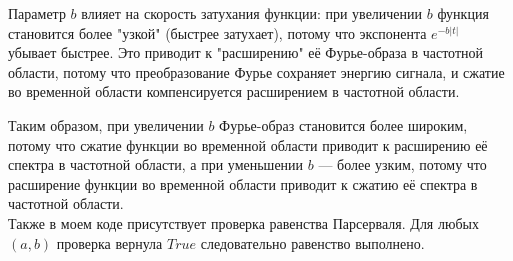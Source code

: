 \documentclass[a4paper,12pt]{article}
\begin{document}
Параметр \( b \) влияет на скорость затухания функции: при увеличении \( b \) функция становится более "узкой" (быстрее затухает), потому что экспонента \( e^{-b |t|} \) убывает быстрее. Это приводит к "расширению" её Фурье-образа в частотной области, потому что преобразование Фурье сохраняет энергию сигнала, и сжатие во временной области компенсируется расширением в частотной области.

Таким образом, при увеличении \( b \) Фурье-образ становится более широким, потому что сжатие функции во временной области приводит к расширению её спектра в частотной области, а при уменьшении \( b \) — более узким, потому что расширение функции во временной области приводит к сжатию её спектра в частотной области. \\


Также в моем коде присутствует проверка равенства Парсерваля. Для любых \( (a, b) \) проверка вернула \( True\) следовательно равенство выполнено.
\end{document}
